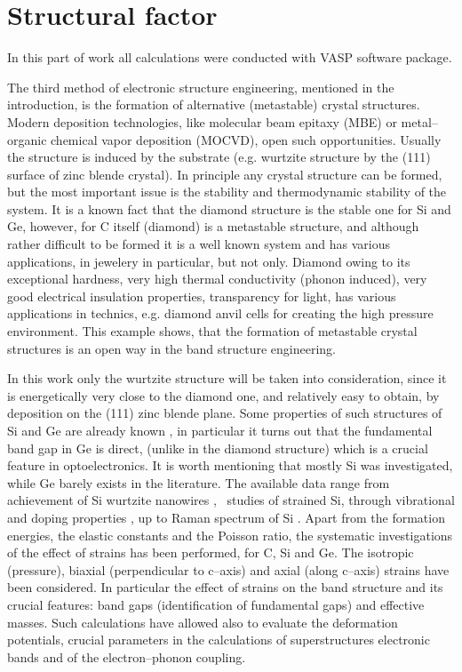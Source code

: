 \ornament

\section{Structural factor}

In this part of work all calculations were conducted with VASP software package.

The third method of electronic structure engineering, mentioned in the introduction, is the formation of alternative (metastable) crystal structures.
Modern deposition technologies, like molecular beam epitaxy (MBE) or metal--organic chemical vapor deposition (MOCVD), open such opportunities.
Usually the structure is induced by the substrate (e.g. wurtzite structure by the (111) surface of zinc blende crystal).
In principle any crystal structure can be formed, but the most important issue is the stability and thermodynamic stability of the system.
It is a known fact that the diamond structure is the stable one for Si and Ge, however, for C itself (diamond) is a metastable structure, and although rather difficult to be formed it is a well known system and has various applications, in jewelery in particular,  but not only.
Diamond owing to its exceptional hardness, very high thermal conductivity (phonon induced), very good electrical insulation properties, transparency for light, has various applications in technics, e.g. diamond anvil cells for creating the high pressure environment.
This example shows, that the formation of metastable crystal structures is an open way in the band structure engineering.

In this work only the wurtzite structure will be taken into consideration, since it is energetically very close to the diamond one, and relatively easy to obtain, by deposition on the (111) zinc blende plane.
Some properties of such structures of Si and Ge are already known \cite{wz_si_exp1,wz_si_exp2,wz_si_exp3,wz_si_exp4,wz_si_exp5,wz_ge_exp6}, in particular it turns out that the fundamental band gap in Ge is direct, (unlike in the diamond structure) which is a crucial feature in optoelectronics.
It is worth mentioning that mostly Si was investigated, while Ge barely exists in the literature.
The available data range from achievement of Si wurtzite nanowires \cite{wz_si_exp1}, \abinitio\ studies of strained Si, through vibrational \cite{wz_si_exp2} and doping properties \cite{wz_si_exp3,wz_si_exp4}, up to Raman spectrum of Si \cite{wz_si_exp5}.
Apart from the formation energies, the elastic constants and the Poisson ratio, the systematic investigations of the effect of strains has been performed, for C, Si and Ge.
The isotropic (pressure), biaxial (perpendicular to c--axis) and axial (along c--axis) strains have been considered.
In particular the effect of strains on the band structure and its crucial features: band gaps (identification of fundamental gaps) and effective masses.
Such calculations have allowed also to evaluate the deformation potentials, crucial parameters in the calculations of superstructures electronic bands and of the electron--phonon coupling. 


